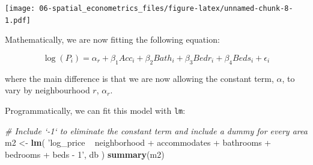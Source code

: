 \documentclass[
]{book}
\newenvironment{Shaded}{\begin{snugshade}}{\end{snugshade}}
\newcommand{\CommentTok}[1]{\textcolor[rgb]{0.56,0.35,0.01}{\textit{#1}}}
\newcommand{\KeywordTok}[1]{\textcolor[rgb]{0.13,0.29,0.53}{\textbf{#1}}}
\newcommand{\NormalTok}[1]{#1}
\newcommand{\StringTok}[1]{\textcolor[rgb]{0.31,0.60,0.02}{#1}}
\begin{document}
\texttt{[image: 06-spatial\_econometrics\_files/figure-latex/unnamed-chunk-8-1.pdf]}

Mathematically, we are now fitting the following equation:

\[
\log(P_i) = \alpha_r + \beta_1 Acc_i + \beta_2 Bath_i + \beta_3 Bedr_i + \beta_4 Beds_i + \epsilon_i
\]

where the main difference is that we are now allowing the constant term, \(\alpha\), to vary by neighbourhood \(r\), \(\alpha_r\).

Programmatically, we can fit this model with \texttt{lm}:

\begin{Shaded}
\begin{Highlighting}[]
\CommentTok{# Include `-1` to eliminate the constant term and include a dummy for every area}
\NormalTok{m2 <-}\StringTok{ }\KeywordTok{lm}\NormalTok{(}
  \StringTok{'log_price ~ neighborhood + accommodates + bathrooms + bedrooms + beds - 1'}\NormalTok{, }
\NormalTok{  db}
\NormalTok{)}
\KeywordTok{summary}\NormalTok{(m2)}
\end{Highlighting}
\end{Shaded}
\end{document}
